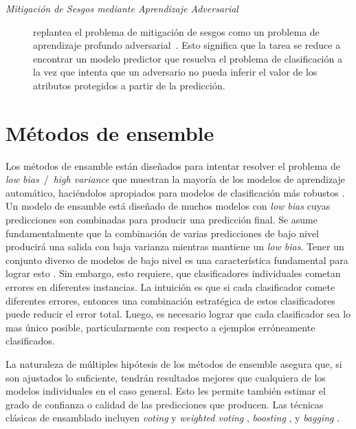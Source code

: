 \begin{description}
\item[\emph{Mitigación de Sesgos mediante Aprendizaje Adversarial}~\parencite{zhang2018mitigating}] replantea el problema de mitigación de sesgos como un problema de aprendizaje profundo adversarial~\parencite{goodfellow2014adversarial}.
Esto significa que la tarea se reduce a encontrar un modelo predictor que resuelva el problema de clasificación a la vez que intenta que un adversario no pueda inferir el valor de los atributos protegidos a partir de la predicción.

\end{description}

\section{Métodos de ensemble}\label{section:ensembles}

Los métodos de ensamble están diseñados para intentar resolver el problema de \emph{low bias}~/~\emph{high variance} que muestran la mayoría de los modelos de aprendizaje automático, haciéndolos apropiados para modelos de clasificación más robustos \parencite{polikar2006ensemble}.
Un modelo de ensamble está diseñado de muchos modelos con \emph{low bias} cuyas predicciones son combinadas para producir una predicción final.
Se asume fundamentalmente que la combinación de varias predicciones de bajo nivel producirá una salida con baja varianza mientras mantiene un \emph{low bias}.
Tener un conjunto diverso de modelos de bajo nivel es una característica fundamental para lograr esto \parencite{polikar2006ensemble}.
Sin embargo, esto requiere, que clasificadores individuales cometan errores en diferentes instancias.
La intuición es que si cada clasificador comete diferentes errores, entonces una combinación estratégica de estos clasificadores puede reducir el error total. Luego, es necesario lograr que cada clasificador sea lo mas único posible, particularmente con respecto a ejemplos erróneamente clasificados.

La naturaleza de múltiples hipótesis de los métodos de ensemble asegura que, si son ajustados lo suficiente, tendrán resultados mejores que cualquiera de los modelos individuales en el caso general. Esto les permite también estimar el grado de confianza o calidad de las predicciones que producen. Las técnicas clásicas de ensamblado incluyen \emph{voting} y \textit{weighted voting} \parencite{dietterich2000ensemble}, \emph{boosting} \parencite{schapire1990strength}, y \emph{bagging} \parencite{breiman1996bagging}.

